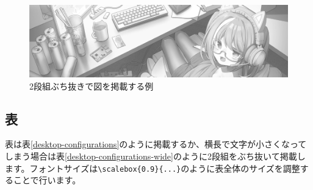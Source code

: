 \begin{figure}[t]
  \begin{center}
    \includegraphics[width=\linewidth]{images/c99-header.png}
  \end{center}
  \caption{2段組ぶち抜きで図を掲載する例}
  \label{landscape-image}
\end{figure}

\subsection{表}
表は表\ref{desktop-configurations}のように掲載するか、横長で文字が小さくなってしまう場合は表\ref{desktop-configurations-wide}のように2段組をぶち抜いて掲載します。フォントサイズは\verb=\scalebox{0.9}{...}=のように表全体のサイズを調整することで行います。

\begin{table}[t]
  \caption{通常の表掲載例}
  \label{desktop-configurations}
  \begin{center}
    \end{center}
\end{table}

